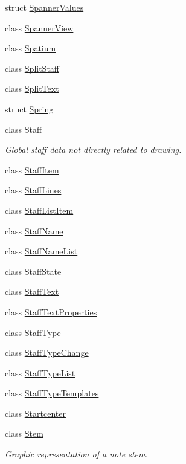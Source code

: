 \begin{DoxyCompactItemize}
struct \hyperlink{struct_ms_1_1_spanner_values}{Spanner\+Values}
\item 
class \hyperlink{class_ms_1_1_spanner_view}{Spanner\+View}
\item 
class \hyperlink{class_ms_1_1_spatium}{Spatium}
\item 
class \hyperlink{class_ms_1_1_split_staff}{Split\+Staff}
\item 
class \hyperlink{class_ms_1_1_split_text}{Split\+Text}
\item 
struct \hyperlink{struct_ms_1_1_spring}{Spring}
\item 
class \hyperlink{class_ms_1_1_staff}{Staff}
\begin{DoxyCompactList}\small\item\em Global staff data not directly related to drawing. \end{DoxyCompactList}\item 
class \hyperlink{class_ms_1_1_staff_item}{Staff\+Item}
\item 
class \hyperlink{class_ms_1_1_staff_lines}{Staff\+Lines}
\item 
class \hyperlink{class_ms_1_1_staff_list_item}{Staff\+List\+Item}
\item 
class \hyperlink{class_ms_1_1_staff_name}{Staff\+Name}
\item 
class \hyperlink{class_ms_1_1_staff_name_list}{Staff\+Name\+List}
\item 
class \hyperlink{class_ms_1_1_staff_state}{Staff\+State}
\item 
class \hyperlink{class_ms_1_1_staff_text}{Staff\+Text}
\item 
class \hyperlink{class_ms_1_1_staff_text_properties}{Staff\+Text\+Properties}
\item 
class \hyperlink{class_ms_1_1_staff_type}{Staff\+Type}
\item 
class \hyperlink{class_ms_1_1_staff_type_change}{Staff\+Type\+Change}
\item 
class \hyperlink{class_ms_1_1_staff_type_list}{Staff\+Type\+List}
\item 
class \hyperlink{class_ms_1_1_staff_type_templates}{Staff\+Type\+Templates}
\item 
class \hyperlink{class_ms_1_1_startcenter}{Startcenter}
\item 
class \hyperlink{class_ms_1_1_stem}{Stem}
\begin{DoxyCompactList}\small\item\em Graphic representation of a note stem. \end{DoxyCompactList}\item 

\end{DoxyCompactItemize}
